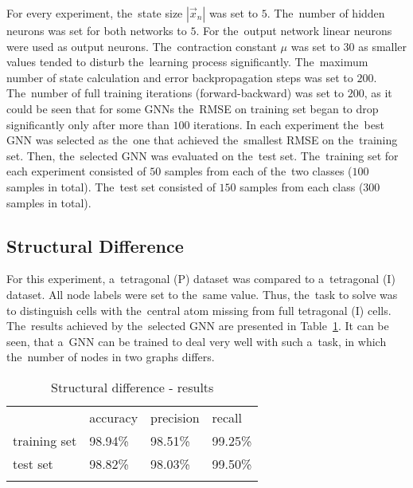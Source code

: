 \documentclass{llncs}
\begin{document}
For every experiment, the~state size $|\vec{x}_n|$ was set to $5$. The~number of hidden neurons was set for both networks to $5$. For the~output network linear neurons were used as output neurons. The~contraction constant $\mu$ was set to $30$ as smaller values tended to disturb the~learning process significantly. The~maximum number of state calculation and error backpropagation steps was set to $200$. The~number of full training iterations (forward-backward) was set to $200$, as it could be seen that for some GNNs the~RMSE on training set began to drop significantly only after more than $100$ iterations. In each experiment the~best GNN was selected as the~one that achieved the~smallest RMSE on the~training set. Then, the~selected GNN was evaluated on the~test set. The~training set for each experiment consisted of $50$ samples from each of the~two classes ($100$ samples in total). The~test set consisted of $150$ samples from each class ($300$ samples in total).

\subsection{Structural Difference}
For this experiment, a~tetragonal (P) dataset was compared to a~tetragonal (I) dataset. All node labels were set to the~same value. Thus, the~task to solve was to distinguish cells with the~central atom missing from full tetragonal (I) cells. The~results achieved by the~selected GNN are presented in Table~\ref{tab:struct}. It can be seen, that a~GNN can be trained to deal very well with such a~task, in which the~number of nodes in two graphs differs.

\begin{table}[h!]
\begin{center}
\caption{Structural difference - results}
\begin{tabular}{llll}
\hline\noalign{\smallskip}
 & accuracy & precision & recall\\
\noalign{\smallskip}
\hline
\noalign{\smallskip}
training set & 98.94\% &  98.51\% & 99.25\% \\
test set & 98.82\% & 98.03\% &  99.50\% \\
\hline
\label{tab:struct}
\end{tabular}
\end{center}
\end{table}
\end{document}
